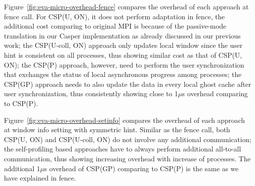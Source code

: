 Figure~\ref{fig:eva-micro-overhead-fence} compares the overhead of each
approach at fence call. For CSP(U, ON), it does not perform adaptation
in fence, the additional cost comparing to original MPI is because of
the passive-mode translation in our Casper implementation as already
discussed in our previous work; the CSP(U-coll, ON) approach only updates
local window since the user hint is consistent on all processes, thus
showing similar cost as that of CSP(U, ON); the CSP(P) approach, however,
need to perform the user synchronization that exchanges the status of
local asynchronous progress among processes; the CSP(GP) approach needs to also update the data in every local ghost cache after user synchronization,
thus consistently showing close to 1$\mu$s overhead comparing to CSP(P).


Figure~\ref{fig:eva-micro-overhead-setinfo} compares the overhead of each
approach at window info setting with symmetric hint. Similar as the fence
call, both CSP(U, ON) and CSP(U-coll, ON) do not involve any additional
communication; the self-profiling based approaches have to always perform
additional all-to-all communication, thus showing increasing overhead
with increase of processes. The additional 1$\mu$s overhead of
CSP(GP) comparing to CSP(P) is the same as we have explained in fence.


